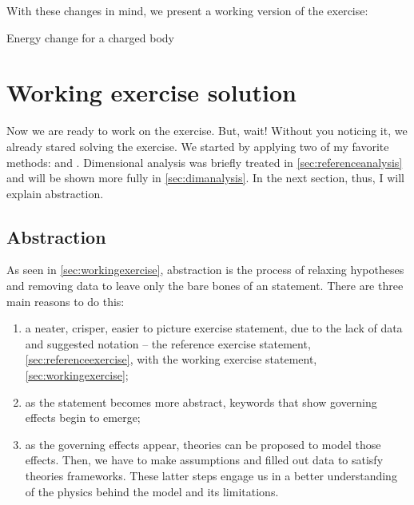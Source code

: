 With these changes in mind, we present a working version of the exercise:
%
\begin{description}
%
\item[Energy change for a charged body] 
%
\end{description}


\section{Working exercise solution}
%
Now we are ready to work on the exercise. But, wait! Without you noticing it, we already stared solving the exercise. We started by applying two of my favorite methods:  and . Dimensional analysis was briefly treated in \cref{sec:referenceanalysis} and will be shown more fully in \cref{sec:dimanalysis}. In the next section, thus, I will explain abstraction.


\subsection{Abstraction}
%
%
As seen in \cref{sec:workingexercise}, abstraction is the process of relaxing hypotheses and removing data to leave only the bare bones of an statement. There are three main reasons to do this:
%
\begin{enumerate}
%
\item a neater, crisper, easier to picture exercise statement, due to the lack of data and suggested notation -- \confer the reference exercise statement, \cref{sec:referenceexercise}, with the working exercise statement, \cref{sec:workingexercise};
%
\item as the statement becomes more abstract, keywords that show governing effects begin to emerge;
%
\item as the governing effects appear, theories can be proposed to model those effects. Then, we have to make assumptions and filled out data to satisfy theories frameworks. These latter steps engage us in a better understanding of the physics behind the model and its limitations.
%
\end{enumerate}

